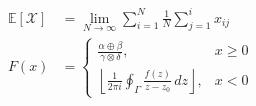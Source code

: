 \begin{align}\mathbb{E}\left[\mathcal{X}\right]&=\lim_{N\to\infty}\sum_{i=1}^{N}\frac{1}{N}\sum_{j=1}^{i}x_{ij}\\F(x)&=\begin{cases}\frac{\alpha\oplus\beta}{\gamma\otimes\delta},&x\ge0\\\left\lfloor\frac{1}{2\pi i}\oint_{\Gamma}\frac{f(z)}{z-z_0}\,dz\right\rfloor,&x<0\end{cases}\end{align}
